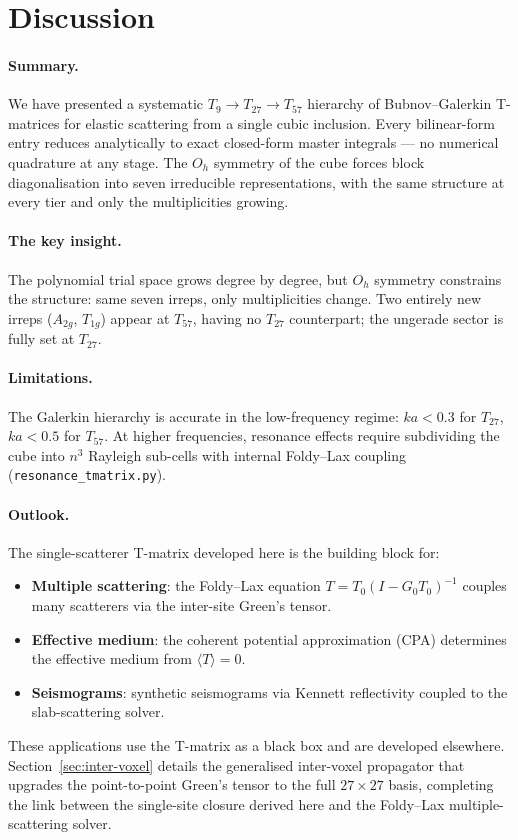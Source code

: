 \documentclass[11pt,a4paper]{article}
\newcommand{\Oh}{O_h}
\theoremstyle{plain}
\theoremstyle{definition}
\theoremstyle{remark}
\begin{document}
\section{Discussion}
\label{sec:discussion}

\paragraph{Summary.}
We have presented a systematic $T_9 \to T_{27} \to T_{57}$ hierarchy
of Bubnov--Galerkin T-matrices for elastic scattering from a single
cubic inclusion.  Every bilinear-form entry reduces analytically to
exact closed-form master integrals --- no numerical quadrature at
any stage.  The $\Oh$ symmetry of the cube forces block
diagonalisation into seven irreducible representations, with the same
structure at every tier and only the multiplicities growing.

\paragraph{The key insight.}
The polynomial trial space grows degree by degree, but $\Oh$ symmetry
constrains the structure: same seven irreps, only multiplicities
change.  Two entirely new irreps ($A_{2g}$, $T_{1g}$) appear at
$T_{57}$, having no $T_{27}$ counterpart; the ungerade sector is
fully set at $T_{27}$.

\paragraph{Limitations.}
The Galerkin hierarchy is accurate in the low-frequency regime:
$ka < 0.3$ for $T_{27}$, $ka < 0.5$ for $T_{57}$.  At higher
frequencies, resonance effects require subdividing the cube into
$n^3$ Rayleigh sub-cells with internal Foldy--Lax coupling
(\texttt{resonance\_tmatrix.py}).

\paragraph{Outlook.}
The single-scatterer T-matrix developed here is the building block
for:
\begin{itemize}[nosep]
  \item \textbf{Multiple scattering}: the Foldy--Lax equation
    $T = T_0(I - G_0 T_0)^{-1}$ couples many scatterers via the
    inter-site Green's tensor.
  \item \textbf{Effective medium}: the coherent potential approximation
    (CPA) determines the effective medium from $\langle T \rangle = 0$.
  \item \textbf{Seismograms}: synthetic seismograms via
    Kennett reflectivity coupled to the slab-scattering solver.
\end{itemize}
These applications use the T-matrix as a black box and are
developed elsewhere.  Section~\ref{sec:inter-voxel} details the
generalised inter-voxel propagator that upgrades the point-to-point
Green's tensor to the full $27\times 27$ basis, completing the
link between the single-site closure derived here and the
Foldy--Lax multiple-scattering solver.
\end{document}
